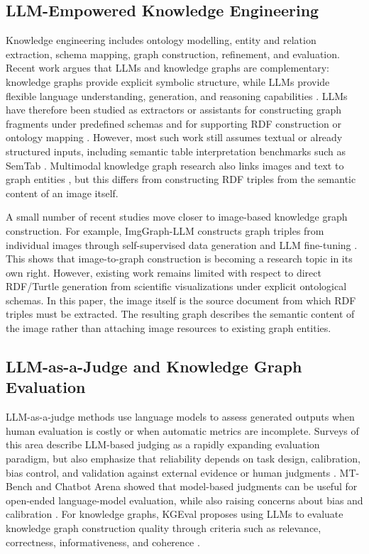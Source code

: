\documentclass[preprint,12pt]{elsarticle}
\begin{document}
\subsection{LLM-Empowered Knowledge Engineering}

Knowledge engineering includes ontology modelling, entity and relation extraction, schema mapping, graph construction, refinement, and evaluation. Recent work argues that LLMs and knowledge graphs are complementary: knowledge graphs provide explicit symbolic structure, while LLMs provide flexible language understanding, generation, and reasoning capabilities \citep{pan2024llmkgroadmap}. LLMs have therefore been studied as extractors or assistants for constructing graph fragments under predefined schemas and for supporting RDF construction or ontology mapping \citep{ghanemcruz2025kgc,mavridis2025rdfkg}. However, most such work still assumes textual or already structured inputs, including semantic table interpretation benchmarks such as SemTab \citep{semtab2022,semtab2024}. Multimodal knowledge graph research also links images and text to graph entities \citep{richpedia,multimodalkgsurvey}, but this differs from constructing RDF triples from the semantic content of an image itself.

A small number of recent studies move closer to image-based knowledge graph construction. For example, ImgGraph-LLM constructs graph triples from individual images through self-supervised data generation and LLM fine-tuning \citep{chen2025pixels}. This shows that image-to-graph construction is becoming a research topic in its own right. However, existing work remains limited with respect to direct RDF/Turtle generation from scientific visualizations under explicit ontological schemas. In this paper, the image itself is the source document from which RDF triples must be extracted. The resulting graph describes the semantic content of the image rather than attaching image resources to existing graph entities.

\subsection{LLM-as-a-Judge and Knowledge Graph Evaluation}

LLM-as-a-judge methods use language models to assess generated outputs when human evaluation is costly or when automatic metrics are incomplete. Surveys of this area describe LLM-based judging as a rapidly expanding evaluation paradigm, but also emphasize that reliability depends on task design, calibration, bias control, and validation against external evidence or human judgments \citep{gu2024llmjudge}. MT-Bench and Chatbot Arena showed that model-based judgments can be useful for open-ended language-model evaluation, while also raising concerns about bias and calibration \citep{mtbench}. For knowledge graphs, KGEval proposes using LLMs to evaluate knowledge graph construction quality through criteria such as relevance, correctness, informativeness, and coherence \citep{kgeval}.
\end{document}
